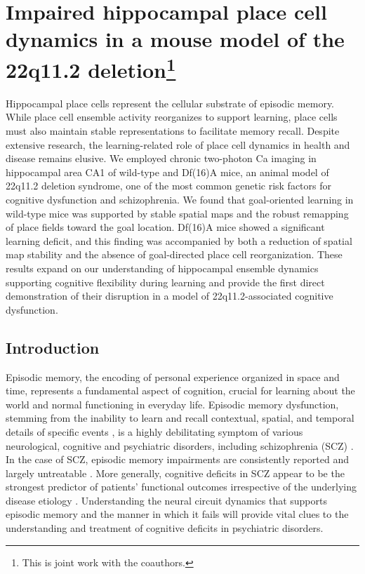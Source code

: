 \chapter[Impaired hippocampal place cell dynamics in a mouse model of the 22q11.2 deletion]{Impaired hippocampal place cell dynamics in a mouse model of the 22q11.2 deletion\footnote{This is joint work with the coauthors.}}
\label{ch:df}

Hippocampal place cells represent the cellular substrate of episodic memory. While place cell ensemble activity reorganizes to support learning, place cells must also maintain stable representations to facilitate memory recall. Despite extensive research, the learning-related role of place cell dynamics in health and disease remains elusive. We employed chronic two-photon Ca imaging in hippocampal area CA1 of wild-type and Df(16)A\super{+/-} mice, an animal model of 22q11.2 deletion syndrome, one of the most common genetic risk factors for cognitive dysfunction and schizophrenia. We found that goal-oriented learning in wild-type mice was supported by stable spatial maps and the robust remapping of place fields toward the goal location. Df(16)A\super{+/-} mice showed a significant learning deficit, and this finding was accompanied by both a reduction of spatial map stability and the absence of goal-directed place cell reorganization. These results expand on our understanding of hippocampal ensemble dynamics supporting cognitive flexibility during learning and provide the first direct demonstration of their disruption in a model of 22q11.2-associated cognitive dysfunction.

\section{Introduction}

Episodic memory, the encoding of personal experience organized in space and time, represents a fundamental aspect of cognition, crucial for learning about the world and normal functioning in everyday life. Episodic memory dysfunction, stemming from the inability to learn and recall contextual, spatial, and temporal details of specific events \citep{Dickerson2010, Eichenbaum2000}, is a highly debilitating symptom of various neurological, cognitive and psychiatric disorders, including schizophrenia (SCZ) \citep{Dere2010, Leavitt2009}. In the case of SCZ, episodic memory impairments are consistently reported \citep{Aleman1999, Schaefer2013} and largely untreatable \citep{Green1996, Ibrahim2011, Keefe2007}. More generally, cognitive deficits in SCZ appear to be the strongest predictor of patients’ functional outcomes irrespective of the underlying disease etiology \citep{Green1996, Ranganath2008}. Understanding the neural circuit dynamics that supports episodic memory and the manner in which it fails will provide vital clues to the understanding and treatment of cognitive deficits in psychiatric disorders.

